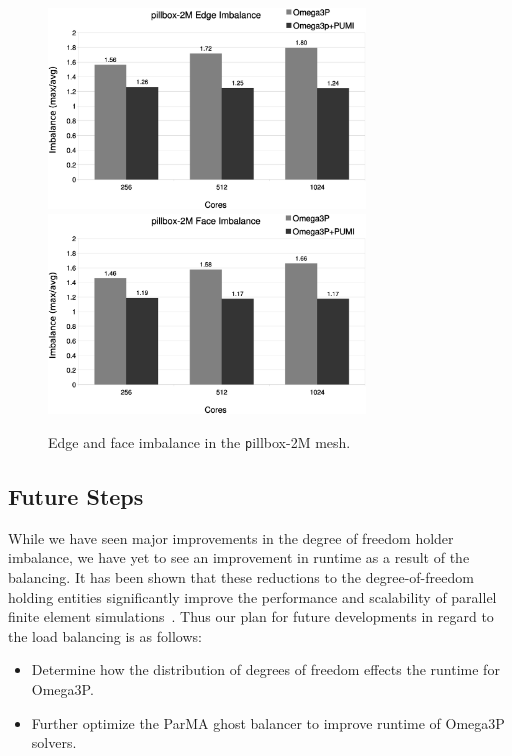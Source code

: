 \documentclass[review,12pt]{elsarticle_summary_report}
\begin{document}
\begin{figure}[!ph]
\centering
  \includegraphics[width=0.75\textwidth]{pillbox2M-edge-imb.eps} \\
  \includegraphics[width=0.75\textwidth]{pillbox2M-face-imb.eps}
  \caption{\label{fig:pillboximb} Edge and face imbalance in the {\texttt
  pillbox-2M}
  mesh.}
\end{figure}

\subsection{\label{load_balance_future} Future Steps}
While we have seen major improvements in the degree of freedom holder imbalance,
we have yet to see an improvement in runtime as a result of the balancing. It has been shown that 
these reductions to the degree-of-freedom holding entities significantly improve the 
performance and scalability of
parallel finite element simulations~\cite{zhou2012unstructured}.
 Thus our plan for future developments in regard to the load balancing  is as follows:

\begin{itemize}
  \item Determine how the distribution of degrees of freedom effects the runtime for Omega3P.
  \item Further optimize the ParMA ghost balancer to improve runtime of Omega3P solvers.
\end{itemize}
\end{document}
